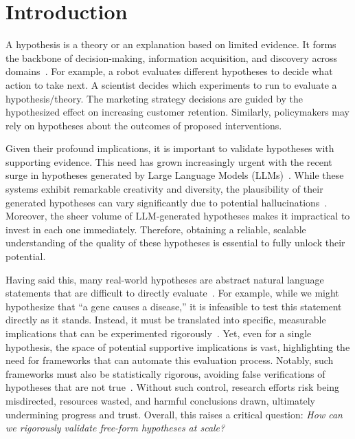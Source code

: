 \vspace{-2mm}
\section{Introduction}

A hypothesis is a theory or an explanation based on limited evidence. It forms the backbone of decision-making, information acquisition, and discovery across domains~\cite{thompson2023scope}. For example, a robot evaluates different hypotheses to decide what action to take next. A scientist decides which experiments to run to evaluate a hypothesis/theory. The marketing strategy decisions are guided by the hypothesized effect on increasing customer retention. Similarly, policymakers may rely on hypotheses about the outcomes of proposed interventions. \

Given their profound implications, it is important to validate hypotheses with supporting evidence. This need has grown increasingly urgent with the recent surge in hypotheses generated by Large Language Models (LLMs)~\cite{wang2023hypothesis,zhou2024hypothesis}. While these systems exhibit remarkable creativity and diversity, the plausibility of their generated hypotheses can vary significantly due to potential hallucinations~\cite{huang2023survey}. Moreover, the sheer volume of LLM-generated hypotheses makes it impractical to invest in each one immediately. Therefore, obtaining a reliable, scalable understanding of the quality of these hypotheses is essential to fully unlock their potential.


Having said this, many real-world hypotheses are abstract natural language statements that are difficult to directly evaluate~\cite{thompson2023scope,godfrey2009theory}. For example, while we might hypothesize that ``a gene causes a disease,'' it is infeasible to test this statement directly as it stands. Instead, it must be translated into specific, measurable implications that can be experimented rigorously~\cite{jun2022hypothesis}. 
Yet, even for a single hypothesis, the space of potential supportive implications  is vast, highlighting the need for frameworks that can automate this evaluation process. 
Notably, such frameworks must also be statistically rigorous, avoiding false verifications of hypotheses that are not true~\cite{neyman1928use,neyman1933testing,fisher1936design}. 
Without such control, research efforts risk being misdirected, resources wasted, and harmful conclusions drawn, ultimately undermining progress and trust. Overall, this raises a critical question: \textit{How can we rigorously validate free-form hypotheses at scale?}

